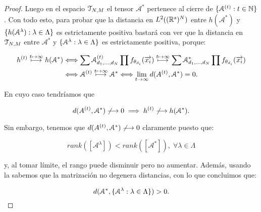 \begin{proof}
    Luego en el espacio $\mathcal{T}_{N, M}$ el tensor $\mathcal{A}^*$ pertenece al cierre de $\{ \mathcal{A}^{(t)}: t \in \mathbb{N} \}$. Con todo esto, para probar que la distancia en $L^2((\mathbb{R}^s)^N)$ entre $h(\mathcal{A}^*)$ y $\{ h(\mathcal{A}^\lambda): \lambda \in \Lambda \}$ es estrictamente positiva bastará con ver que la distancia en $\mathcal{T}_{N, M}$ entre $\mathcal{A}^*$ y $\{ \mathcal{A}^\lambda: \lambda \in \Lambda \}$ es estrictamente positiva, porque:

    \begin{equation}
        \begin{split}
            h^{(t)} \stackrel{t \mapsto \infty}{\longmapsto} h(\mathcal{A}^*) &\Longleftrightarrow \sum \mathcal{A}^{(t)}_{d_1, \ldots, d_N} \prod f_{\theta_{d_i}}(\overrightarrow{x_i}) \stackrel{t \mapsto \infty}{\longmapsto} \sum \mathcal{A}^*_{d_1, \ldots, d_N} \prod f_{\theta_{d_i}}(\overrightarrow{x_i}) \\
            &\Longleftrightarrow \mathcal{A}^{(t)} \stackrel{t \mapsto \infty}{\longmapsto} \mathcal{A}^* \Longleftrightarrow \lim_{t \to \infty} d(A^{(t)}, \mathcal{A}^*) = 0. \\
        \end{split}
    \end{equation}

    En cuyo caso tendríamos que

    \begin{equation}
        d(A^{(t)}, \mathcal{A}^*) \not\longrightarrow 0 \implies h^{(t)} \not\longrightarrow h(\mathcal{A}^*).
    \end{equation}

    Sin embargo, tenemos que $d(A^{(t)}, \mathcal{A}^*) \not\longrightarrow 0$ claramente puesto que:

    \begin{equation}
        rank([\mathcal{A}^\lambda]) < rank([\mathcal{A}^*]),
        \; \forall \lambda \in \Lambda
    \end{equation}

    y, al tomar límite, el rango puede disminuir pero no aumentar. Además, usando la  sabemos que la matrización no degenera distancias, con lo que concluimos que:

    \begin{equation}
        d(\mathcal{A}^*, \{ \mathcal{A}^\lambda: \lambda \in \Lambda \}) > 0.
    \end{equation}

\end{proof}

